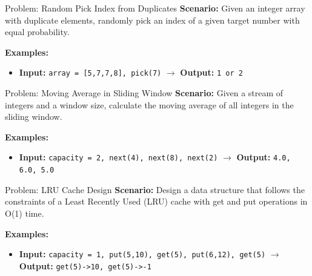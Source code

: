 \begin{frame}[fragile]{Problem: Random Pick Index from Duplicates}
  \textbf{Scenario:}
  Given an integer array with duplicate elements, randomly pick an index of a given target number with equal probability.
  
  \vspace{0.3cm}
  \textbf{Examples:}
  \begin{itemize}
    \item \textbf{Input:} \texttt{array = [5,7,7,8], pick(7)} $\rightarrow$ \textbf{Output:} \texttt{1 or 2}
  \end{itemize}
\end{frame}

\begin{frame}[fragile]{Problem: Moving Average in Sliding Window}
  \textbf{Scenario:}
  Given a stream of integers and a window size, calculate the moving average of all integers in the sliding window.
  
  \vspace{0.3cm}
  \textbf{Examples:}
  \begin{itemize}
    \item \textbf{Input:} \texttt{capacity = 2, next(4), next(8), next(2)} $\rightarrow$ \textbf{Output:} \texttt{4.0, 6.0, 5.0}
  \end{itemize}
\end{frame}

\begin{frame}[fragile]{Problem: LRU Cache Design}
  \textbf{Scenario:}
  Design a data structure that follows the constraints of a Least Recently Used (LRU) cache with get and put operations in O(1) time.
  
  \vspace{0.3cm}
  \textbf{Examples:}
  \begin{itemize}
    \item \textbf{Input:} \texttt{capacity = 1, put(5,10), get(5), put(6,12), get(5)} $\rightarrow$ \textbf{Output:} \texttt{get(5)->10, get(5)->-1}
  \end{itemize}
\end{frame}
